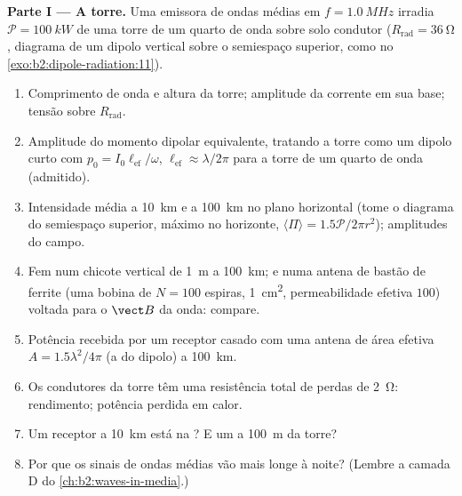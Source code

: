 \begin{problem}
\label{pb:b2:dipole-radiation:1}

\medskip
\noindent\textbf{Parte I --- A torre.}
Uma emissora de ondas médias em $f = \qty{1.0}{MHz}$ irradia $\mathcal P = \qty{100}{kW}$
de uma torre de um quarto de onda sobre solo condutor ($R_{\text{rad}} = \qty{36}{\ohm}$,
diagrama de um dipolo vertical sobre o semiespaço superior, como no
\cref{exo:b2:dipole-radiation:11}).
\begin{enumerate}
  \item Comprimento de onda e altura da torre; amplitude da corrente em sua
        base; tensão sobre $R_{\text{rad}}$.
  \item Amplitude do momento dipolar equivalente, tratando a torre como um
        dipolo curto com $p_0 = I_0\ell_{\text{ef}}/\omega$, $\ell_{\text{ef}} \approx
        \lambda/2\pi$ para a torre de um quarto de onda (admitido).
  \item Intensidade média a \qty{10}{km} e a \qty{100}{km} no plano
        horizontal (tome o diagrama do semiespaço superior, máximo no
        horizonte, $\langle\Pi\rangle = 1.5\mathcal P/2\pi r^2$); amplitudes do campo.
  \item Fem num chicote vertical de \qty{1}{m} a \qty{100}{km}; e numa antena
        de bastão de ferrite (uma bobina de $N = 100$ espiras, \qty{1}{cm^2},
        permeabilidade efetiva $100$) voltada para o $\vect B$ da onda: compare.
  \item Potência recebida por um receptor casado com uma antena de
        área efetiva $A = 1.5\lambda^2/4\pi$ (a do dipolo) a \qty{100}{km}.
  \item Os condutores da torre têm uma resistência total de perdas de
        \qty{2}{\ohm}: rendimento; potência perdida em calor.
  \item Um receptor a \qty{10}{km} está na ? E um a
        \qty{100}{m} da torre?
  \item Por que os sinais de ondas médias vão mais longe à noite? (Lembre a
        camada D do \cref{ch:b2:waves-in-media}.)
\end{enumerate}


\end{problem}
